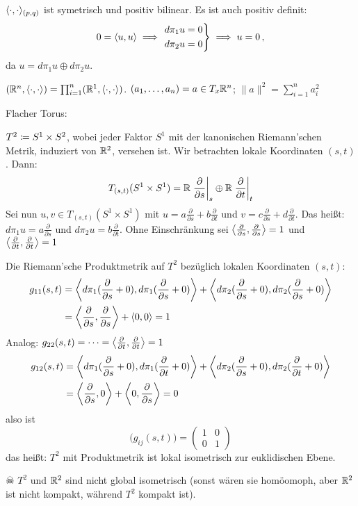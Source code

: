 \documentclass[a4paper,twoside,DIV15,BCOR12mm]{scrbook}
\begin{document}
$\langle\cdot,\cdot\rangle_{(p,q)}$ ist symetrisch und positiv bilinear. Es ist auch positiv definit:
\[
0 = \langle u,u\rangle \implies 
\left.\begin{aligned}
d\pi_1 u = 0 \\
d\pi_2 u = 0
\end{aligned}\right\} \implies u=0\,,
\]
da $u=d\pi_1u \oplus d\pi_2 u$.

\begin{beispiele}
\item $(\mathbb{R}^n,\langle\cdot,\cdot\rangle) = \prod_{i=1}^n (\mathbb{R}^1,\langle\cdot,\cdot\rangle)$. $(a_1,\ldots,a_n) = a \in T_x\mathbb{R}^n$; $\|a\|^2 = \sum_{i=1}^n a_i^2$
\item Flacher Torus:

$T^2 \da S^1 \times S^2$, wobei jeder Faktor $S^1$ mit der kanonischen Riemann’schen Metrik, induziert von $\mathbb{R}^2$, versehen ist. Wir betrachten lokale Koordinaten $(s,t)$. Dann:
\[
T_{(s,t)}(S^1\times S^1) = \mathbb{R} \left.\frac{\partial}{\partial s}\right|_s \oplus \mathbb{R} \left.\frac{\partial}{\partial t}\right|_t
\]
Sei nun $u,v\in T_{(s,t)}(S^1\times S^1)$ mit $u=a \frac\partial{\partial s} + b \frac\partial{\partial t}$ und $v=c \frac\partial{\partial s} + d \frac\partial{\partial t}$. Das heißt: $d\pi_1 u = a \frac\partial{\partial s}$ und $d\pi_2 u = b \frac\partial{\partial t}$.  
Ohne Einschränkung sei $\left\langle\frac\partial{\partial s},\frac\partial{\partial s}\right\rangle = 1$ und $\left\langle\frac\partial{\partial t},\frac\partial{\partial t}\right\rangle = 1$

Die Riemann’sche Produktmetrik auf $T^2$ bezüglich lokalen Koordinaten $(s,t)$:
\begin{align*}
g_{11}(s,t) &= \left\langle d\pi_1 ({\frac\partial{\partial s}} + 0),d\pi_1 ({\frac\partial{\partial s}} + 0)\right\rangle + \left\langle d\pi_2 ({\frac\partial{\partial s}} + 0),d\pi_2 ({\frac\partial{\partial s}} + 0)\right\rangle \\
&= \left\langle\frac\partial{\partial s},\frac\partial{\partial s}\right\rangle + \left\langle0,0\right\rangle = 1
\end{align*}
Analog: $g_{22}(s,t) = \cdots = \left\langle\frac\partial{\partial t},\frac\partial{\partial t}\right\rangle = 1$
\begin{align*}
g_{12}(s,t) &= \left\langle d\pi_1 ({\frac\partial{\partial s}} + 0),d\pi_1 ({\frac\partial{\partial t}} + 0)\right\rangle + \left\langle d\pi_2 ({\frac\partial{\partial s}} + 0),d\pi_2 ({\frac\partial{\partial t}} + 0)\right\rangle \\
&= \left\langle\frac\partial{\partial s},0\right\rangle + \left\langle0,\frac\partial{\partial s}\right\rangle = 0
\end{align*}
also ist
\[
\Big( g_{ij}(s,t) \Big) = 
\begin{pmatrix}
1 & 0 \\ 0 & 1
\end{pmatrix}
\]
das heißt: $T^2$ mit Produktmetrik ist lokal isometrisch zur euklidischen Ebene. 

$\skull$ $T^2$ und $\mathbb{R}^2$ sind nicht global isometrisch (sonst wären sie homöomoph, aber $\mathbb{R}^2$ ist nicht kompakt, während $T^2$ kompakt ist).


\end{beispiele}
\end{document}
